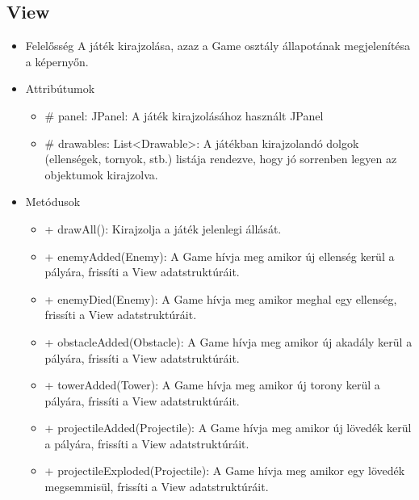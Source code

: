\subsection{View}
\begin{itemize}
\item Felelősség \newline
A játék kirajzolása, azaz a Game osztály állapotának megjelenítésa a képernyőn.
\item Attribútumok
	\begin{itemize}
		\item \# panel: JPanel: A játék kirajzolásához használt JPanel
		\item \# drawables: List<Drawable>: A játékban kirajzolandó dolgok (ellenségek, tornyok, stb.) listája rendezve, hogy jó sorrenben legyen az objektumok kirajzolva.
	\end{itemize}
\item Metódusok
	\begin{itemize}
		\item + drawAll(): Kirajzolja a játék jelenlegi állását.
		\item + enemyAdded(Enemy): A Game hívja meg amikor új ellenség kerül a pályára, frissíti a View adatstruktúráit.
		\item + enemyDied(Enemy): A Game hívja meg amikor meghal egy ellenség, frissíti a View adatstruktúráit.
		\item + obstacleAdded(Obstacle): A Game hívja meg amikor új akadály kerül a pályára, frissíti a View adatstruktúráit.
		\item + towerAdded(Tower): A Game hívja meg amikor új torony kerül a pályára, frissíti a View adatstruktúráit.
		\item + projectileAdded(Projectile): A Game hívja meg amikor új lövedék kerül a pályára, frissíti a View adatstruktúráit.
		\item + projectileExploded(Projectile): A Game hívja meg amikor egy lövedék megsemmisül, frissíti a View adatstruktúráit.
	\end{itemize}
\end{itemize}

